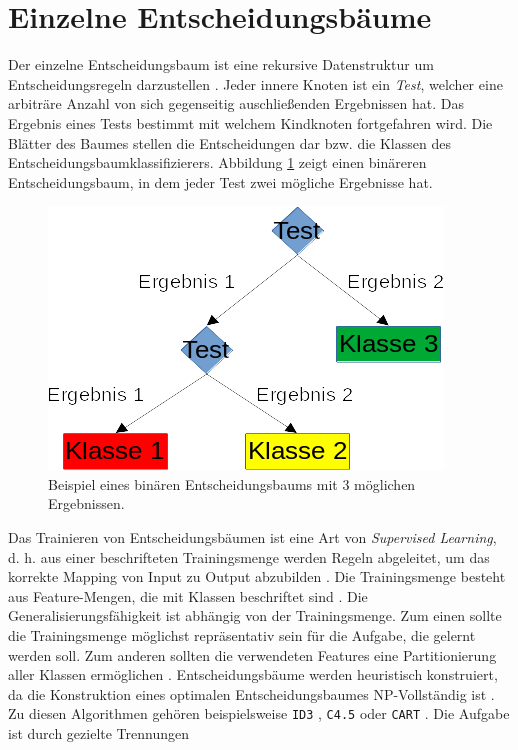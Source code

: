 \section{Einzelne Entscheidungsbäume}
\label{sec:dt_ind_decision_trees}
Der einzelne Entscheidungsbaum ist eine rekursive Datenstruktur um Entscheidungsregeln darzustellen \cite{quinlan1990decision}.
Jeder innere Knoten ist ein \textit{Test}, welcher eine arbiträre Anzahl von sich gegenseitig auschließenden Ergebnissen hat.
Das Ergebnis eines Tests bestimmt mit welchem Kindknoten fortgefahren wird.
Die Blätter des Baumes stellen die Entscheidungen dar bzw. die Klassen des Entscheidungsbaumklassifizierers.
Abbildung \ref{fig:entscheidungsbaum} zeigt einen binäreren Entscheidungsbaum, in dem jeder Test zwei mögliche Ergebnisse hat.
\begin{figure}[h!]
    \centering
    \includegraphics[width=0.5\linewidth]{images/entscheidungsbaum.png}
    \caption{Beispiel eines binären Entscheidungsbaums mit 3 möglichen Ergebnissen.}
    \label{fig:entscheidungsbaum}
\end{figure}
Das Trainieren von Entscheidungsbäumen ist eine Art von \textit{Supervised Learning}, d. h. aus einer beschrifteten Trainingsmenge werden Regeln abgeleitet, um das korrekte Mapping von Input
zu Output abzubilden \cite{goshKMeans}. Die Trainingsmenge besteht aus Feature-Mengen, die mit Klassen beschriftet sind \cite{steinbergCART}. Die Generalisierungsfähigkeit ist abhängig von der
Trainingsmenge. Zum einen sollte die Trainingsmenge möglichst repräsentativ sein für die Aufgabe, die gelernt werden soll. Zum anderen sollten die verwendeten Features eine Partitionierung
aller Klassen ermöglichen \cite{pei1998feature}.
\newline
\newline
Entscheidungsbäume werden heuristisch konstruiert, da die Konstruktion eines optimalen Entscheidungsbaumes NP-Vollständig ist \cite{laurent1976constructing}. Zu diesen Algorithmen gehören
beispielsweise \texttt{ID3} \cite{quinlan1986induction}, \texttt{C4.5} \cite{quinlan2014c4} oder \texttt{CART} \cite{breiman1984classification}. Die Aufgabe ist durch gezielte Trennungen

